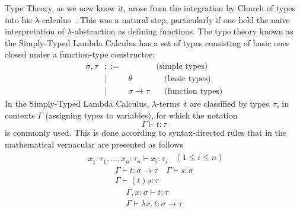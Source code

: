 \documentclass[11pt,twocolumn]{article}
\newcommand{\lcalculus}{\mbox{$\lambda$-calculus}}
\begin{document}
Type Theory, as we now know it, arose from the integration by Church
of types into his \lcalculus~\cite{Church1940}.  This was a natural step,
particularly if one held the naive interpretation of \mbox{$\lambda$-abstraction} as
defining functions.  The type theory known as the Simply-Typed Lambda
Calculus has a set of types consisting of basic ones closed under a
function-type constructor:
  \[\begin{array}{rcll}
    \sigma,\tau & ::= & & \mbox{(simple types)}\\
    & \mid & \theta & \quad\mbox{(basic types)}\\
    & \mid & \sigma\to\tau & \quad\mbox{(function types)}
  \end{array}\]
In the Simply-Typed Lambda
Calculus, \mbox{$\lambda$-terms}~$t$ are classified by types~$\tau$, in
contexts $\Gamma$ (assigning types to variables), for which the notation
  \[
  \Gamma\vdash t:\tau
\]
is commonly used.  This is done according to syntax-directed rules that in the
mathematical vernacular are presented as follows
  \[
  \begin{array}{c}
    \\ \hline
    x_1:\tau_1,\ldots,x_n:\tau_n\vdash x_i:\tau_i
  \end{array}
  \enspace(1\leq i\leq n)
\]
  \[\begin{array}{c}
    \Gamma\vdash t:\sigma\to\tau
    \quad 
    \Gamma\vdash s:\sigma
    \\ \hline
    \Gamma\vdash (t)s:\tau
\end{array}\]
\vspace*{-2mm}
  \begin{equation}\label{LambdaAbstraction} 
  \begin{array}{c}
    \Gamma,x:\sigma\vdash t:\tau
    \\ \hline
    \Gamma\vdash\lambda x.\,t:\sigma\to\tau
  \end{array}
\end{equation}
\vspace*{-2mm}
\end{document}
